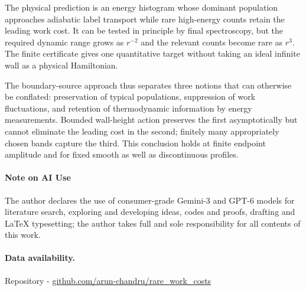 \documentclass[aps,prl,reprint,superscriptaddress,longbibliography]{revtex4-2}
\begin{document}
The physical prediction is an energy histogram whose dominant population approaches adiabatic label transport while rare high-energy counts retain the leading work cost. It can be tested in principle by final spectroscopy, but the required dynamic range grows as $r^{-2}$ and the relevant counts become rare as $r^3$. The finite certificate gives one quantitative target without taking an ideal infinite wall as a physical Hamiltonian.

The boundary-source approach thus separates three notions that can otherwise be conflated: preservation of typical populations, suppression of work fluctuations, and retention of thermodynamic information by energy measurements. Bounded wall-height action preserves the first asymptotically but cannot eliminate the leading cost in the second; finitely many appropriately chosen bands capture the third. This conclusion holds at finite endpoint amplitude and for fixed smooth as well as discontinuous profiles.

\paragraph*{Note on AI Use}
The author declares the use of consumer-grade Gemini-3 and GPT-6 models for literature search, exploring and developing ideas, codes and proofs, drafting and LaTeX typesetting; the author takes full and sole responsibility for all contents of this work.

\paragraph*{Data availability.}
Repository - 
\href{https://github.com/arun-chandru/rare_work_costs}{github.com/arun-chandru/rare\_work\_costs}
\end{document}
